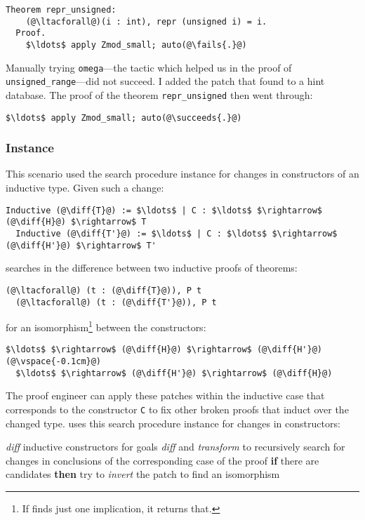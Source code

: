 \begin{lstlisting}[language=coq]
  Theorem repr_unsigned:
    (@\ltacforall@)(i : int), repr (unsigned i) = i.
  Proof.
    $\ldots$ apply Zmod_small; auto(@\fails{.}@)
\end{lstlisting}
Manually trying \lstinline{omega}---the tactic which helped us in the proof of \lstinline{unsigned_range}---did not
succeed.
I added the patch that \sysname found to a hint database.
The proof of the theorem \lstinline{repr_unsigned} then went through:

\begin{lstlisting}[language=coq]
  $\ldots$ apply Zmod_small; auto(@\succeeds{.}@)
\end{lstlisting}

\subsubsection{Instance}

This scenario used the search procedure instance for changes in constructors of an inductive type.
Given such a change:

\begin{lstlisting}[language=coq]
  Inductive (@\diff{T}@) := $\ldots$ | C : $\ldots$ $\rightarrow$ (@\diff{H}@) $\rightarrow$ T
  Inductive (@\diff{T'}@) := $\ldots$ | C : $\ldots$ $\rightarrow$ (@\diff{H'}@) $\rightarrow$ T'
\end{lstlisting}
\sysname searches in the difference between two inductive proofs of theorems:

\begin{lstlisting}[language=coq]
  (@\ltacforall@) (t : (@\diff{T}@)), P t
  (@\ltacforall@) (t : (@\diff{T'}@)), P t
\end{lstlisting}
for an isomorphism\footnote{If \sysname finds just one implication, it returns that.} between the constructors:

\begin{lstlisting}[language=coq]
  $\ldots$ $\rightarrow$ (@\diff{H}@) $\rightarrow$ (@\diff{H'}@)(@\vspace{-0.1cm}@)
  $\ldots$ $\rightarrow$ (@\diff{H'}@) $\rightarrow$ (@\diff{H}@)
\end{lstlisting}
The proof engineer can apply these patches within the inductive case that corresponds to the constructor \lstinline{C}
to fix other broken proofs that induct over the changed type. 
\sysname uses this search procedure instance for changes in constructors:

\begin{algorithm}
\footnotesize
\begin{algorithmic}[1]
    \STATE \textit{diff} inductive constructors for goals
    \STATE \textit{diff} and \textit{transform} to recursively search for changes in conclusions of the corresponding case of the proof
    \STATE \textbf{if} there are candidates \textbf{then}
    \STATE \hspace*{1em} try to \textit{invert} the patch to find an isomorphism 
\end{algorithmic}
\end{algorithm}


